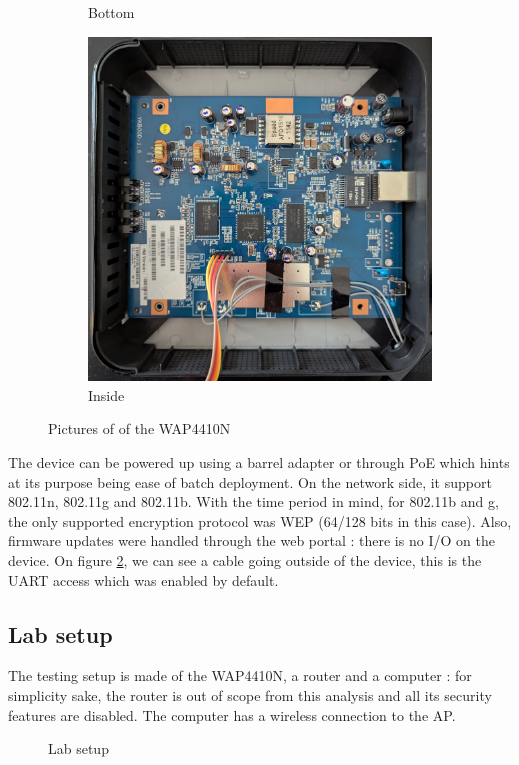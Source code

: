 \documentclass{article}
\begin{document}
\begin{figure}[!h]
\begin{subfigure}{0.3\textwidth}
		\caption{Bottom}
		\label{bottom}
	\end{subfigure}
	\begin{subfigure}{0.3\textwidth}
		\includegraphics[width=\textwidth]{inside.jpg}
		\caption{Inside}
		\label{inside}
	\end{subfigure}
	\caption{Pictures of of the WAP4410N}
	\label{wap4410n}
\end{figure}

\noindent The device can be powered up using a barrel adapter or through PoE which hints at its purpose being ease of batch deployment. On the network side, it support 802.11n, 802.11g and 802.11b. With the time period in mind, for 802.11b and g, the only supported encryption protocol was WEP (64/128 bits in this case). Also, firmware updates were handled through the web portal : there is no I/O on the device. On figure \ref{inside}, we can see a cable going outside of the device, this is the UART access which was enabled by default.
\subsection{Lab setup}
The testing setup is made of the WAP4410N, a router and a computer : for simplicity sake, the router is out of scope from this analysis and all its security features are disabled. The computer has a wireless connection to the AP.
\begin{figure}[!ht]
		
	\caption{Lab setup}
\end{figure}
\end{document}
